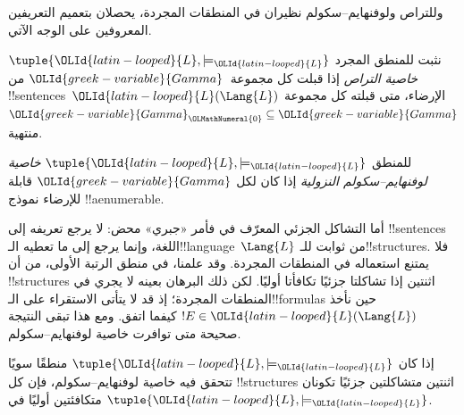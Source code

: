 \documentclass[../../../include/open-logic-section]{subfiles}
\begin{document}


وللتراص ولوفنهايم--سكولم نظيران في المنطقات المجردة، يحصلان بتعميم
التعريفين المعروفين على الوجه الآتي.

\begin{defn}
نثبت للمنطق المجرد $\tuple{\OLId{latin-looped}{L},\models_\OLId{latin-looped}{L}}$ \emph{خاصية التراص} إذا قبلت كل
مجموعة~$\OLId{greek-variable}{Gamma}$ من !!{sentence}s~$\OLId{latin-looped}{L}(\Lang{L})$ الإرضاء، متى قبلته
كل مجموعة $\OLId{greek-variable}{Gamma}_\OLMathNumeral{0} \subseteq \OLId{greek-variable}{Gamma}$ منتهية.
\end{defn}

\begin{defn}
للمنطق $\tuple{\OLId{latin-looped}{L},\models_\OLId{latin-looped}{L}}$ \emph{خاصية لوفنهايم--سكولم النزولية} إذا
كان لكل $\OLId{greek-variable}{Gamma}$ قابلة للإرضاء نموذج !!a{enumerable}.
\end{defn}


أما التشاكل الجزئي المعرّف في  فأمر «جبري» محض:
لا يرجع تعريفه إلى !!{sentence}s اللغة، وإنما يرجع إلى ما تعطيه
الـ!!{language}~$\Lang{L}$ من ثوابت للـ!!{structure}s. فلا يمتنع استعماله
في المنطقات المجردة. وقد علمنا، في منطق الرتبة الأولى، من
 أن !!{structure}s اثنتين إذا تشاكلتا جزئيًا
تكافأتا أوليًا. لكن ذلك البرهان بعينه لا يجري في المنطقات المجردة؛ إذ قد لا يتأتى
الاستقراء على الـ!!{formula}s حين نأخذ $!E \in \OLId{latin-looped}{L}(\Lang{L})$
كيفما اتفق. ومع هذا تبقى النتيجة صحيحة متى توافرت خاصية لوفنهايم--سكولم.

\begin{thm}
إذا كان $\tuple{\OLId{latin-looped}{L},\models_\OLId{latin-looped}{L}}$ منطقًا سويًا تتحقق فيه خاصية لوفنهايم--سكولم،
فإن كل !!{structure}s اثنتين متشاكلتين جزئيًا تكونان متكافئتين أوليًا في
$\tuple{\OLId{latin-looped}{L},\models_\OLId{latin-looped}{L}}$.
\end{thm}
\end{document}
